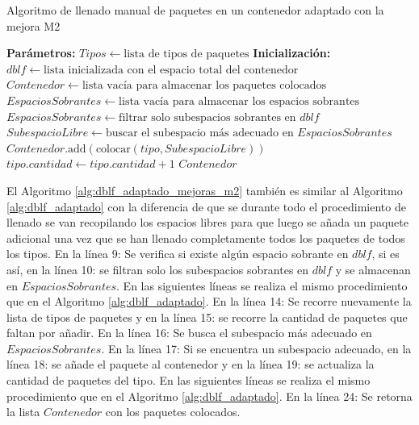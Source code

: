\documentclass[openany]{article}
\begin{document}
\begin{algorithm}[H]
    \caption{Algoritmo de llenado manual de paquetes en un contenedor adaptado con la mejora M2}
    \label{alg:dblf_adaptado_mejoras_m2}
    \begin{algorithmic}[1]
        \State \textbf{Parámetros:} $Tipos \gets \text{lista de tipos de paquetes}$
        \State \textbf{Inicialización:} $dblf \gets \text{lista inicializada con el espacio total del contenedor}$
        \State $Contenedor \gets \text{lista vacía para almacenar los paquetes colocados}$
        \State $EspaciosSobrantes \gets \text{lista vacía para almacenar los espacios sobrantes}$
        \State {} 
        \EndFor
        \State $EspaciosSobrantes \gets \text{filtrar solo subespacios sobrantes en } dblf$
        \EndIf
        \EndFor
        \State {}
        \State $SubespacioLibre \gets \text{buscar el subespacio más adecuado en } EspaciosSobrantes$
        \State $Contenedor.\text{add}( \text{colocar}(tipo, SubespacioLibre) )$
        \State $tipo.cantidad \gets tipo.cantidad + 1$
        \EndIf
        \EndFor
        \EndFor
        \State {} 
        \State \Return $Contenedor$
    \end{algorithmic}
\end{algorithm}

El Algoritmo \ref{alg:dblf_adaptado_mejoras_m2} también es similar al Algoritmo \ref{alg:dblf_adaptado} con la diferencia de que se durante todo el procedimiento de llenado se van recopilando los espacios libres para que luego se añada un paquete adicional una vez que se han llenado completamente todos los paquetes de todos los tipos. En la línea 9: Se verifica si existe algún espacio sobrante en $dblf$, si es así, en la línea 10: se filtran solo los subespacios sobrantes en $dblf$ y se almacenan en $EspaciosSobrantes$. En las siguientes líneas se realiza el mismo procedimiento que en el Algoritmo \ref{alg:dblf_adaptado}. En la línea 14: Se recorre nuevamente la lista de tipos de paquetes y en la línea 15: se recorre la cantidad de paquetes que faltan por añadir. En la línea 16: Se busca el subespacio más adecuado en $EspaciosSobrantes$. En la línea 17: Si se encuentra un subespacio adecuado, en la línea 18: se añade el paquete al contenedor y en la línea 19: se actualiza la cantidad de paquetes del tipo. En las siguientes líneas se realiza el mismo procedimiento que en el Algoritmo \ref{alg:dblf_adaptado}. En la línea 24: Se retorna la lista $Contenedor$ con los paquetes colocados.
\end{document}
